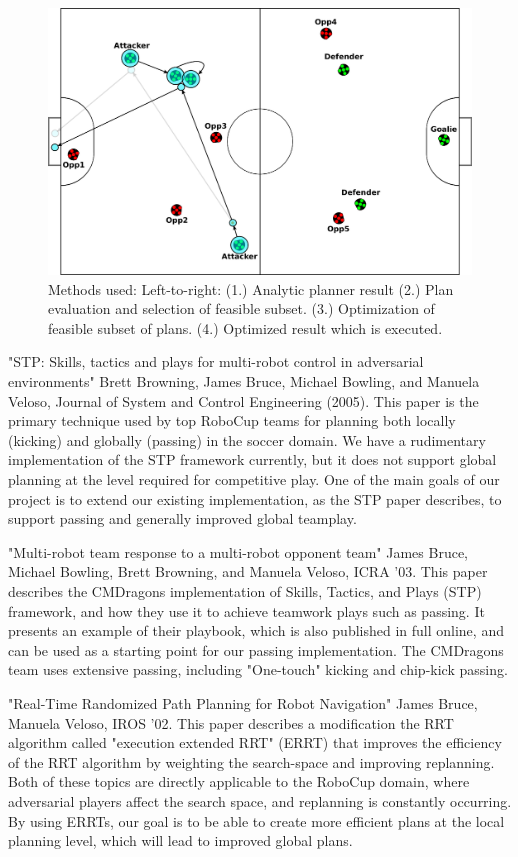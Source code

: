\documentclass[a4paper, 10pt, conference]{ieeeconf}      %
\begin{document}
\begin{figure}[ht!]
\begin{center}
\includegraphics[totalheight=1.0in]{plan4_resized.eps}
\end{center}
\caption{Methods used: Left-to-right: (1.) Analytic planner result (2.) Plan evaluation and selection of feasible subset. (3.) Optimization of feasible subset of plans. (4.) Optimized result which is executed.}
\end{figure}

"STP: Skills, tactics and plays for multi-robot control in adversarial environments" Brett Browning, James Bruce, Michael Bowling, and Manuela Veloso, Journal of System and Control Engineering (2005). This paper is the primary technique used by top RoboCup teams for planning both locally (kicking) and globally (passing) in the soccer domain. We have a rudimentary implementation of the STP framework currently, but it does not support global planning at the level required for competitive play. One of the main goals of our project is to extend our existing implementation, as the STP paper describes, to support passing and generally improved global teamplay.

"Multi-robot team response to a multi-robot opponent team" James Bruce, Michael Bowling, Brett Browning, and Manuela Veloso, ICRA '03. This paper describes the CMDragons implementation of Skills, Tactics, and Plays (STP) framework, and how they use it to achieve teamwork plays such as passing. It presents an example of their playbook, which is also published in full online, and can be used as a starting point for our passing implementation. The CMDragons team uses extensive passing, including "One-touch" kicking and chip-kick passing.

"Real-Time Randomized Path Planning for Robot Navigation" James Bruce, Manuela Veloso, IROS '02. This paper describes a modification the RRT algorithm called "execution extended RRT" (ERRT) that improves the efficiency of the RRT algorithm by weighting the search-space and improving replanning. Both of these topics are directly applicable to the RoboCup domain, where adversarial players affect the search space, and replanning is constantly occurring. By using ERRTs, our goal is to be able to create more efficient plans at the local planning level, which will lead to improved global plans.
\end{document}

